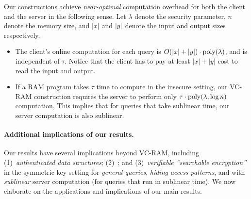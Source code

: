 Our constructions achieve {\it near-optimal} computation overhead
for both the client and the server in the following sense.
Let $\lambda$ denote the security parameter,
$n$ denote the memory size, and $|x|$ and $|y|$ denote
the input and output sizes respectively.
\begin{itemize}
\item
The client's online computation
for each query is $O(|x| + |y|) \cdot {\rm poly}(\lambda)$,
and is independent of $\tau$.
Notice that the client has to pay at least $|x|+|y|$ cost
to read the input and output.
\item
If a RAM program takes $\tau$ time to compute
in the insecure setting,
our VC-RAM construction requires the server
to perform only $\tau \cdot {\rm poly}(\lambda, \log n)$ computation,
This implies that for queries that take sublinear time,
our server computation is also sublinear.
\end{itemize}

\paragraph{Additional implications of our results.}
Our results have several implications beyond VC-RAM,
including (1)~{\it authenticated data structures}; (2)~{\it \name};
and (3)~{\it verifiable
``searchable encryption''} in the symmetric-key setting for
{\it general queries}, {\it hiding access patterns}, 
and with {\it sublinear} server computation (for queries that run in
sublinear time).
We now elaborate on the applications and implications of our main
results.



